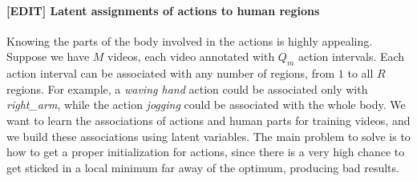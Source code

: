 \paragraph{[EDIT] Latent assignments of actions to human regions}

Knowing the parts of the body involved in the actions is highly appealing. Suppose we have $M$ videos, each video annotated with $Q_m$ action intervals. Each action interval can be associated with any number of regions, from $1$ to all $R$ regions. For example,  a \emph{waving hand} action could be associated only with \emph{right\_arm}, while the action \emph{jogging} could be associated with the whole body. We want to learn the associations of actions and human parts for training videos, and we build these associations using latent variables. The main problem to solve is to how to get a proper initialization for actions, since there is a very high chance to get sticked in a local minimum far away of the optimum, producing bad results.

